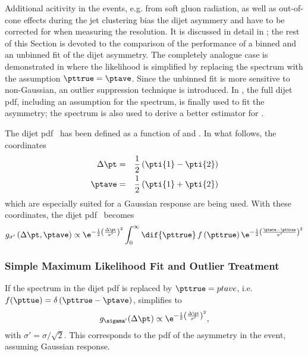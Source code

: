Additional acitivity in the events, e.g. from soft gluon radiation, as
well as out-of-cone effects during the jet clustering bias the dijet asymmery and have to be
corrected for when measuring the resolution.
It is discussed in detail in ; the rest of
this Section is devoted to the comparison of the performance of a
binned and an unbinned fit of the dijet asymmetry.
The completely analogue case is demonstrated in
 where the likelihood is simplified by replacing the spectrum
with the assumption \mbox{$\pttrue = \ptave$}.
Since the unbinned fit is more sensitive to non-Gaussian, an outlier
suppression technique is introduced.
In , the full dijet pdf, including an assumption for the
spectrum, is finally used to fit the asymmetry;
the spectrum is also used to derive a better estimator for \ptgen.

The dijet pdf~ has been defined as a function
of  and .
In what follows, the coordinates
\begin{eqnarray}
  \label{eq:ResFit:TransformedCoordinates}
  \Delta\pt & = & \frac{1}{2}\left(\pti{1}-\pti{2}\right) \\
  \ptave & = & \frac{1}{2}\left(\pti{1}+\pti{2}\right)
\end{eqnarray}
which are especially suited for a Gaussian response are being used.
With these coordinates, the dijet pdf~ becomes
\begin{equation}
  \label{eq:ResFit:DijetPdfTransformed}
   g_{\sigma'}\left(\Delta\pt,\ptave\right) \propto
   \e^{-\frac{1}{2}\left(\frac{\Delta\pt}{\sigma'}\right)^{2}}
   \int^{\infty}_{0}\dif{\pttrue}\,f\left(\pttrue\right)
   \e^{-\frac{1}{2}\left(\frac{\ptave - \pttrue}{\sigma'}\right)^{2}}
\end{equation}



\subsubsection{Simple Maximum Likelihood Fit and Outlier Treatment}\label{sec:ResFit:Asym:SimpleFit}

If the spectrum in the dijet pdf is replaced by \mbox{$\pttrue =
  ptave$}, i.e. \mbox{$f(\pttue)  = \delta\left(\pttrue - \ptave\right)$},
 simplifies to
\begin{equation}
\label{eq:ResFit::DijetPdfTransformed?Simple}
  g_{\sigama'}(\Delta\pt) \propto
  \e^{-\frac{1}{2}\left(\frac{\Delta\pt}{\sigma'}\right)^{2}}, 
\end{equation}
with \mbox{$\sigma' = \sigma/\sqrt{2}$}.
This corresponds to the pdf of the asymmetry in the event, assuming
Gaussian response.

